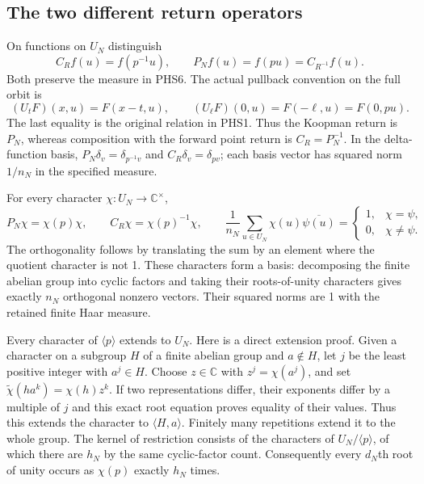 \subsection{The two different return operators}

On functions on $U_N$ distinguish
\begin{equation}\tag{PHS7}
 C_Rf(u)=f(p^{-1}u),\qquad P_Nf(u)=f(pu)=C_{R^{-1}}f(u).
\end{equation}
Both preserve the measure in PHS6. The actual pullback convention
on the full orbit is
\begin{equation}\tag{PHS8}
 (U_tF)(x,u)=F(x-t,u),\qquad
 (U_\ell F)(0,u)=F(-\ell,u)=F(0,pu).
\end{equation}
The last equality is the original relation in PHS1. Thus the
Koopman return is $P_N$, whereas composition with the forward
point return is $C_R=P_N^{-1}$. In the delta-function basis,
$P_N\delta_v=\delta_{p^{-1}v}$ and
$C_R\delta_v=\delta_{pv}$; each basis vector has squared norm
$1/n_N$ in the specified measure.

For every character $\chi:U_N\to\mathbb C^\times$,
\begin{equation}\tag{PHS9}
 P_N\chi=\chi(p)\chi,\qquad
 C_R\chi=\chi(p)^{-1}\chi,\qquad
 \frac1{n_N}\sum_{u\in U_N}\chi(u)\overline{\psi(u)}
       =\begin{cases}1,&\chi=\psi,\\0,&\chi\ne\psi.\end{cases}
\end{equation}
The orthogonality follows by translating the sum by an element where
the quotient character is not 1. These characters form a basis:
decomposing the finite abelian group into cyclic factors and taking
their roots-of-unity characters gives exactly $n_N$ orthogonal
nonzero vectors. Their squared norms are 1 with the retained finite
Haar measure.

Every character of $\langle p\rangle$ extends to $U_N$.
Here is a direct extension proof. Given a character on a subgroup
$H$ of a finite abelian group and $a\notin H$, let $j$ be the
least positive integer with $a^j\in H$. Choose $z\in\mathbb C$
with $z^j=\chi(a^j)$, and set
$\widetilde\chi(ha^k)=\chi(h)z^k$. If two representations
differ, their exponents differ by a multiple of $j$ and this exact
root equation proves equality of their values. Thus this extends
the character to $\langle H,a\rangle$. Finitely many repetitions
extend it to the whole group. The kernel of restriction consists
of the characters of $U_N/\langle p\rangle$, of which there
are $h_N$ by the same cyclic-factor count. Consequently every
$d_N$th root of unity occurs as $\chi(p)$ exactly $h_N$ times.

